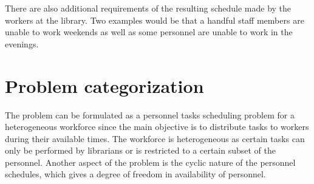 There are also additional requirements of the resulting schedule made by the workers at the library. Two examples would be that a handful staff members are unable to work weekends as well as some personnel are unable to work in the evenings.

\section{Problem categorization}
The problem can be formulated as a personnel tasks scheduling problem for a heterogeneous workforce since the main objective is to distribute tasks to workers during their available times. The workforce is heterogeneous as certain tasks can only be performed by librarians or is restricted to a certain subset of the personnel. Another aspect of the problem is the cyclic nature of the personnel schedules, which gives a degree of freedom in availability of personnel.



